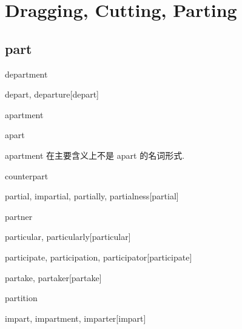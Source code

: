 \chapter{Dragging, Cutting, Parting}

\section{part}

\begin{RefWord}{department}
\end{RefWord}

\begin{RefWord}{depart, departure}[depart]
\end{RefWord}

\begin{RefWord}{apartment}
\end{RefWord}

\begin{RefWord}{apart}
\end{RefWord}

\begin{remark}
    apartment 在主要含义上不是 apart 的名词形式. 
\end{remark}

\begin{RefWord}{counterpart}
\end{RefWord}

\begin{RefWord}{partial, impartial, partially, partialness}[partial]
\end{RefWord}

\begin{RefWord}{partner}
\end{RefWord}

\begin{RefWord}{particular, particularly}[particular]
\end{RefWord}

\begin{RefWord}{participate, participation, participator}[participate]
\end{RefWord}

\begin{RefWord}{partake, partaker}[partake]
\end{RefWord}

\begin{RefWord}{partition}
\end{RefWord}

\begin{RefWord}{impart, impartment, imparter}[impart]
\end{RefWord}

